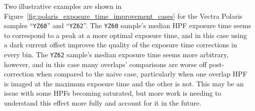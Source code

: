\documentclass[letterpaper,11pt]{article}
\newcommand{\reffig}[1]{Figure~\ref{#1}}
\begin{document}
Two illustrative examples are shown in \reffig{fig:polaris_exposure_time_improvement_cases} for the Vectra Polaris samples ``\texttt{YZ60}'' and ``\texttt{YZ62}''. The \texttt{YZ60} sample's median HPF exposure time seems to correspond to a peak at a more optimal exposure time, and in this case using a dark current offset improves the quality of the exposure time corrections in every bin. The \texttt{YZ62} sample's median exposure time seems more arbitrary, however, and in this case many overlaps' comparisons are worse off post-correction when compared to the naive case, particularly when one overlap HPF is imaged at the maximum exposure time and the other is not. This may be an issue with some HPFs becoming saturated, but more work is needing to understand this effect more fully and account for it in the future.
\end{document}
